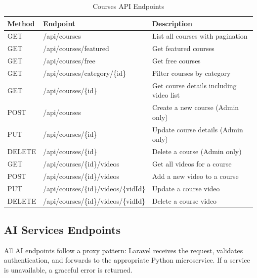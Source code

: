 \begin{table}[H]
\centering
\caption{Courses API Endpoints}
\begin{tabularx}{\textwidth}{|l|l|X|}
\hline
\textbf{Method} & \textbf{Endpoint} & \textbf{Description} \\
\hline
GET    & /api/courses                            & List all courses with pagination \\
\hline
GET    & /api/courses/featured                   & Get featured courses \\
\hline
GET    & /api/courses/free                       & Get free courses \\
\hline
GET    & /api/courses/category/\{id\}            & Filter courses by category \\
\hline
GET    & /api/courses/\{id\}                     & Get course details including video list \\
\hline
POST   & /api/courses                            & Create a new course (Admin only) \\
\hline
PUT    & /api/courses/\{id\}                     & Update course details (Admin only) \\
\hline
DELETE & /api/courses/\{id\}                     & Delete a course (Admin only) \\
\hline
GET    & /api/courses/\{id\}/videos              & Get all videos for a course \\
\hline
POST   & /api/courses/\{id\}/videos              & Add a new video to a course \\
\hline
PUT    & /api/courses/\{id\}/videos/\{vidId\}    & Update a course video \\
\hline
DELETE & /api/courses/\{id\}/videos/\{vidId\}    & Delete a course video \\
\hline
\end{tabularx}
\end{table}

\subsection{AI Services Endpoints}

All AI endpoints follow a proxy pattern: Laravel receives the request, validates
authentication, and forwards to the appropriate Python microservice. If a
service is unavailable, a graceful error is returned.

